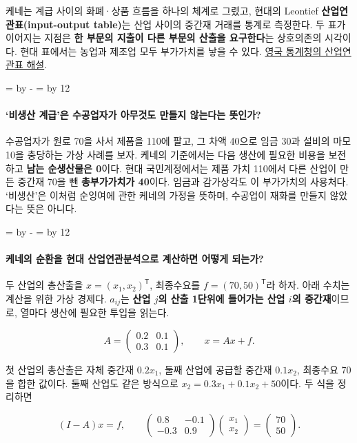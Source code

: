 \documentclass[10pt,a4paper]{article}
\newcommand{\ReserveQuestionSpace}{%
  \par\begingroup
  \dimen0=\pagegoal \advance\dimen0 by -\pagetotal
  \dimen2=\baselineskip \multiply\dimen2 by 12
  \ifdim\dimen0<\dimen2 \newpage\fi
  \endgroup}
\begin{document}
케네는 계급 사이의 화폐·상품 흐름을 하나의 체계로 그렸고, 현대의 Leontief \textbf{산업연관표(input-output table)}는 산업 사이의 중간재 거래를 통계로 측정한다. 두 표가 이어지는 지점은 \textbf{한 부문의 지출이 다른 부문의 산출을 요구한다}는 상호의존의 시각이다. 현대 표에서는 농업과 제조업 모두 부가가치를 낳을 수 있다. \href{https://www.ons.gov.uk/economy/nationalaccounts/supplyandusetables/articles/inputoutputanalyticaltables/guidanceforuse}{영국 통계청의 산업연관표 해설}.\par

\ReserveQuestionSpace
\paragraph{‘비생산 계급’은 수공업자가 아무것도 만들지 않는다는 뜻인가?}
수공업자가 원료 70을 사서 제품을 110에 팔고, 그 차액 40으로 임금 30과 설비의 마모 10을 충당하는 가상 사례를 보자. 케네의 기준에서는 다음 생산에 필요한 비용을 보전하고 \textbf{남는 순생산물은 0}이다. 현대 국민계정에서는 제품 가치 110에서 다른 산업이 만든 중간재 70을 뺀 \textbf{총부가가치가 40}이다. 임금과 감가상각도 이 부가가치의 사용처다. ‘비생산’은 이처럼 순잉여에 관한 케네의 가정을 뜻하며, 수공업이 재화를 만들지 않았다는 뜻은 아니다.\par

\ReserveQuestionSpace
\paragraph{케네의 순환을 현대 산업연관분석으로 계산하면 어떻게 되는가?}
두 산업의 총산출을 $x=(x_1,x_2)^\mathsf{T}$, 최종수요를 $f=(70,50)^\mathsf{T}$라 하자. 아래 수치는 계산을 위한 가상 경제다. $a_{ij}$는 \textbf{산업 $j$의 산출 1단위에 들어가는 산업 $i$의 중간재}이므로, 열마다 생산에 필요한 투입을 읽는다.\par

\[
A=\begin{pmatrix}0.2&0.1\\0.3&0.1\end{pmatrix},\qquad x=Ax+f.
\]

첫 산업의 총산출은 자체 중간재 $0.2x_1$, 둘째 산업에 공급할 중간재 $0.1x_2$, 최종수요 70을 합한 값이다. 둘째 산업도 같은 방식으로 $x_2=0.3x_1+0.1x_2+50$이다. 두 식을 정리하면\par

\[
(I-A)x=f,\qquad
\begin{pmatrix}0.8&-0.1\\-0.3&0.9\end{pmatrix}
\begin{pmatrix}x_1\\x_2\end{pmatrix}
=\begin{pmatrix}70\\50\end{pmatrix}.
\]
\end{document}
